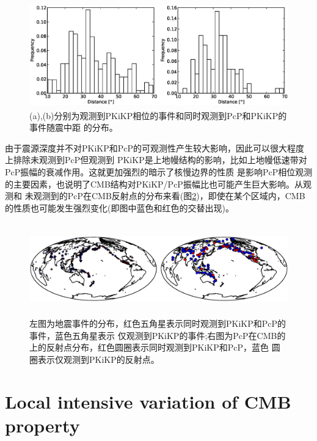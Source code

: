 \begin{figure}[!ht]
	\centering
	\includegraphics[width=12cm,height=4.5cm]{fig/chap4/dist_hist.eps}
	\caption{(a),(b)分别为观测到PKiKP相位的事件和同时观测到PcP和PKiKP的事件随震中距%
的分布。}
	\label{dis_hist}
\end{figure}

由于震源深度并不对PKiKP和PcP的可观测性产生较大影响，因此可以很大程度上排除未观测到PcP但观测到
PKiKP是上地幔结构的影响，比如上地幔低速带对PcP振幅的衰减作用。这就更加强烈的暗示了核慢边界的性质
是影响PcP相位观测的主要因素，也说明了CMB结构对PKiKP/PcP振幅比也可能产生巨大影响。从观测和
未观测到的PcP在CMB反射点的分布来看(图\ref{loc_distri})，即使在某个区域内，CMB的性质也可能发生强烈变化(即图中蓝色和红色的交替出现)。

\begin{figure}[!ht]
	\centering
	\includegraphics[width=12cm,height=4cm]{fig/chap4/loc_distri.eps}
	\caption{左图为地震事件的分布，红色五角星表示同时观测到PKiKP和PcP的事件，蓝色五角星表示%
仅观测到PKiKP的事件;右图为PcP在CMB的上的反射点分布，红色圆圈表示同时观测到PKiKP和PcP，蓝色%
圆圈表示仅观测到PKiKP的反射点。}
	\label{loc_distri}
\end{figure}

\section{Local intensive variation of CMB property}

